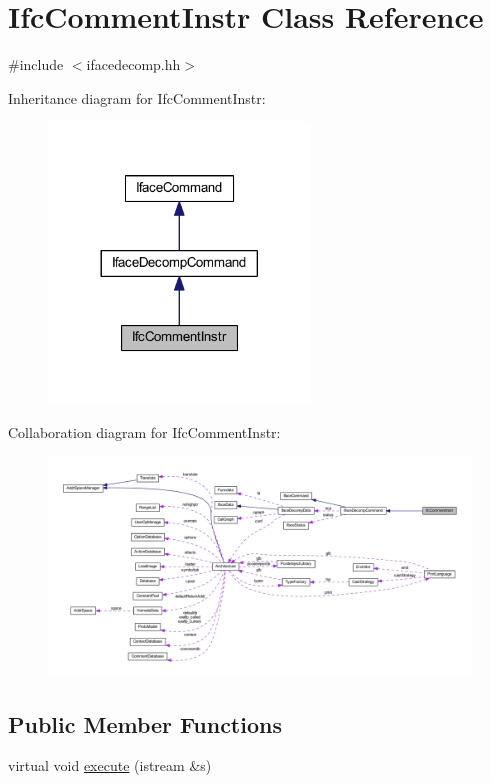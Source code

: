 \hypertarget{class_ifc_comment_instr}{}\section{Ifc\+Comment\+Instr Class Reference}
\label{class_ifc_comment_instr}


{\ttfamily \#include $<$ifacedecomp.\+hh$>$}



Inheritance diagram for Ifc\+Comment\+Instr\+:
\nopagebreak
\begin{figure}[H]
\begin{center}
\leavevmode
\includegraphics[width=197pt]{class_ifc_comment_instr__inherit__graph}
\end{center}
\end{figure}


Collaboration diagram for Ifc\+Comment\+Instr\+:
\nopagebreak
\begin{figure}[H]
\begin{center}
\leavevmode
\includegraphics[width=350pt]{class_ifc_comment_instr__coll__graph}
\end{center}
\end{figure}
\subsection*{Public Member Functions}
\begin{DoxyCompactItemize}
\item 
virtual void \mbox{\hyperlink{class_ifc_comment_instr_a101c4b13e1dff5bd5fde18c7b62cd38c}{execute}} (istream \&s)
\end{DoxyCompactItemize}

